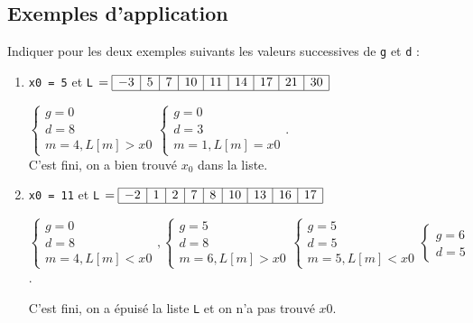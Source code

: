 \subsection{ Exemples d'application}
Indiquer pour les deux exemples suivants les valeurs successives de \texttt{g} et \texttt{d} :
\begin{enumerate}
\item \texttt{x0 = 5} et \texttt{L} $= \begin{array}{|c|c|c|c|c|c|c|c|c|} 
\hline -3 & 5 & 7 & 10 & 11 & 14 & 17 & 21 & 30 \\ \hline
\end{array}$


$\begin{cases}
g=0\\d=8\\m=4,L[m]>x0
\end{cases}
\begin{cases}
g=0\\d=3\\m=1,L[m]=x0
\end{cases}$.\\
C'est fini, on a bien trouvé $x_0$ dans la liste.


\item \texttt{x0 = 11} et \texttt{L} $= \begin{array}{|c|c|c|c|c|c|c|c|c|} 
\hline -2 & 1 & 2 & 7 & 8 & 10 & 13 & 16 & 17  \\ \hline
\end{array}$


$\begin{cases}
g=0\\d=8\\m=4,L[m]<x0
\end{cases},\begin{cases}
g=5\\d=8\\m=6,L[m]>x0
\end{cases}\begin{cases}
g=5\\d=5\\m=5,L[m]<x0
\end{cases}\begin{cases}
g=6\\d=5
\end{cases}$.

C'est fini, on a épuisé la liste \texttt{L} et on n'a pas trouvé $x0$.
\end{enumerate}


